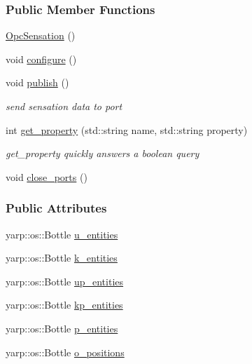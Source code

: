 \subsubsection*{Public Member Functions}
\begin{DoxyCompactItemize}
\item 
\hyperlink{group__sensationManager_a644655ff11acd5918b0ca3ac465c8528}{Opc\+Sensation} ()
\item 
void \hyperlink{group__sensationManager_accf106fa56c11f31095bfb2258feea03}{configure} ()
\item 
void \hyperlink{group__sensationManager_aeec83c521a72fcc52558f6f3df2f48c9}{publish} ()
\begin{DoxyCompactList}\small\item\em send sensation data to port \end{DoxyCompactList}\item 
int \hyperlink{group__sensationManager_a95124152fdd2d312222a9cf53115f87c}{get\+\_\+property} (std\+::string name, std\+::string property)
\begin{DoxyCompactList}\small\item\em get\+\_\+property quickly answers a boolean query \end{DoxyCompactList}\item 
void \hyperlink{group__sensationManager_a53a2ff62e9cecdeeef5f62a23dba8afc}{close\+\_\+ports} ()
\end{DoxyCompactItemize}
\subsubsection*{Public Attributes}
\begin{DoxyCompactItemize}
\item 
yarp\+::os\+::\+Bottle \hyperlink{group__sensationManager_af6c950377f1c046dd2d2ff4d62e82951}{u\+\_\+entities}
\item 
yarp\+::os\+::\+Bottle \hyperlink{group__sensationManager_ad235e03d016e8914a98df4da71538d1f}{k\+\_\+entities}
\item 
yarp\+::os\+::\+Bottle \hyperlink{group__sensationManager_a89d9a34431cd7948ac619bfd1f4734eb}{up\+\_\+entities}
\item 
yarp\+::os\+::\+Bottle \hyperlink{group__sensationManager_a195c83623e253d043f79d4818471190c}{kp\+\_\+entities}
\item 
yarp\+::os\+::\+Bottle \hyperlink{group__sensationManager_a876e783362e316f887cb602cbc34c87d}{p\+\_\+entities}
\item 
yarp\+::os\+::\+Bottle \hyperlink{group__sensationManager_a2b4d31782a277654808d319b177d516d}{o\+\_\+positions}
\end{DoxyCompactItemize}


